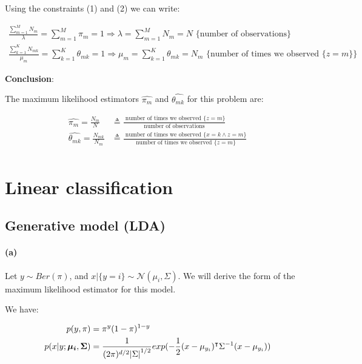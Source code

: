 \documentclass[11pt]{article}
\numberwithin{figure}{section} %
\begin{document}
Using the constraints (1) and (2) we can write:

\begin{equation*}
\begin{aligned}
\frac{\sum\limits_{m=1}^M N_m}{\lambda} = \sum\limits_{m=1}^M \pi_m = 1 \Rightarrow \lambda = \sum\limits_{m=1}^M N_m = N \text{ \ \{number of observations\}} \\
\frac{\sum\limits_{k=1}^K N_{mk}}{\mu_m} = \sum\limits_{k=1}^K \theta_{mk} = 1 \Rightarrow \mu_m = \sum\limits_{k=1}^K \theta_{mk} = N_m \text{ \ \{number of times we observed $\{z=m\}$\}} 
\end{aligned}
\end{equation*}

\textbf{Conclusion}:
\begin{tcolorbox}

The maximum likelihood estimators $\widehat{\pi_m}$ and $\widehat{\theta_{mk}}$ for this problem are:

\begin{align*}
\widehat{\pi_m} = \frac{N_m}{N} & \triangleq \frac{\text{ \ number of times we observed $\{z=m\}$}}{\text{number of observations}} \\
\widehat{\theta_{mk}} = \frac{N_{mk}}{N_m} & \triangleq \frac{\text{  number of times we observed $\{x = k \wedge z=m\}$}}{\text{ \ number of times we observed $\{z=m\}$}} \\
\end{align*}

\end{tcolorbox}

\newpage
\section{Linear classification}
\subsection{Generative model (LDA)}
\paragraph{(a)} Let $y \sim Ber(\pi)$, and $x|\{y=i\} \sim \mathcal{N}(\mu_i, \Sigma)$. We will derive the form of the maximum likelihood estimator for this model.

We have:

\begin{align*}
p(y, \pi) & = {\pi}^y (1-\pi)^{1-y} \\
p(x|y; \boldsymbol{\mu_i}, \boldsymbol{\Sigma}) & = \frac{1}{(2\pi)^{d/2} \abs{\Sigma}^{1/2}}exp(-\frac{1}{2}(x- \mu_{y_i})^{\intercal}\Sigma^{-1}(x-\mu_{y_i}))
\end{align*}
\end{document}
